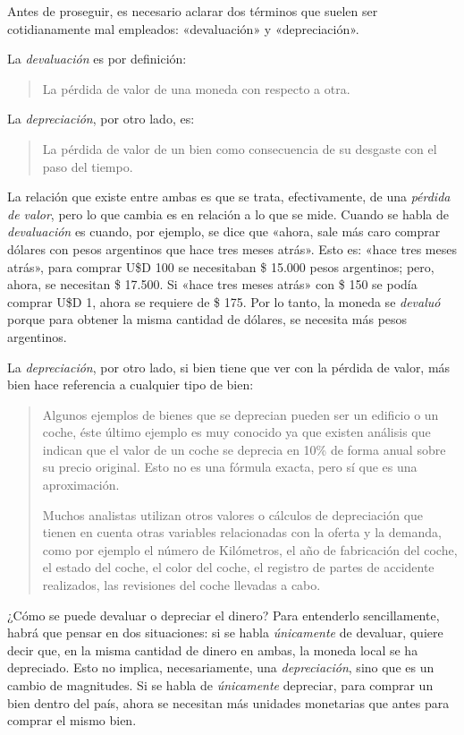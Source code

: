 \documentclass[12pt,a4paper,twoside]{book}
\begin{document}
Antes de proseguir, es necesario aclarar dos términos que suelen ser cotidianamente mal empleados: «devaluación» y «depreciación».

La \textit{devaluación} es por definición:

\begin{quote}
La pérdida de valor de una moneda con respecto a otra. \cite{epedia:deval}
\end{quote}

La \textit{depreciación}, por otro lado, es:

\begin{quote}
La pérdida de valor de un bien como consecuencia de su desgaste con el paso del tiempo. \cite{epedia:depr}
\end{quote}

La relación que existe entre ambas es que se trata, efectivamente, de una \textit{pérdida de valor}, pero lo que cambia es en relación a lo que se mide. Cuando se habla de \textit{devaluación} es cuando, por ejemplo, se dice que «ahora, sale más caro comprar dólares con pesos argentinos que hace tres meses atrás». Esto es: «hace tres meses atrás», para comprar U\$D 100 se necesitaban \$ 15.000 pesos argentinos; pero, ahora, se necesitan \$ 17.500. Si «hace tres meses atrás» con \$ 150 se podía comprar U\$D 1, ahora se requiere de \$ 175. Por lo tanto, la moneda se \textit{devaluó} porque para obtener la misma cantidad de dólares, se necesita más pesos argentinos.

La \textit{depreciación}, por otro lado, si bien tiene que ver con la pérdida de valor, más bien hace referencia a cualquier tipo de bien:

\begin{quotation}
Algunos ejemplos de bienes que se deprecian pueden ser un edificio o un coche, éste último ejemplo es muy conocido ya que existen análisis que indican que el valor de un coche se deprecia en 10\% de forma anual sobre su precio original. Esto no es una fórmula exacta, pero sí que es una aproximación.

Muchos analistas utilizan otros valores o cálculos de depreciación que tienen en cuenta otras variables relacionadas con la oferta y la demanda, como por ejemplo el número de Kilómetros, el año de fabricación del coche, el estado del coche, el color del coche, el registro de partes de accidente realizados, las revisiones del coche llevadas a cabo. \cite{epedia:depr}
\end{quotation}

¿Cómo se puede devaluar o depreciar el dinero? Para entenderlo sencillamente, habrá que pensar en dos situaciones: si se habla \textit{únicamente} de devaluar, quiere decir que, en la misma cantidad de dinero en ambas, la moneda local se ha depreciado. Esto no implica, necesariamente, una \textit{depreciación}, sino que es un cambio de magnitudes. Si se habla de \textit{únicamente} depreciar, para comprar un bien dentro del país, ahora se necesitan más unidades monetarias que antes para comprar el mismo bien.
\end{document}
